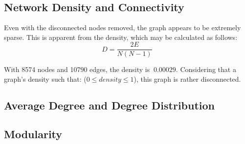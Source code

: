 \subsection{Network Density and Connectivity}\label{subsec:network-density-and-connectivity}


Even with the disconnected nodes removed, the graph appears to be extremely sparse.
This is apparent from the density, which  may be calculated as follows:
\[
    D = \frac{2E}{N(N - 1)}
\]

With 8574 nodes and 10790 edges, the density is $~0.00029$.
Considering that a graph's density such that: ($0 \leq density \leq 1$), this graph is rather disconnected.

\subsection{Average Degree and Degree Distribution}\label{subsec:average-degree-and-degree-distribution}


\subsection{Modularity}\label{subsec:modularity}